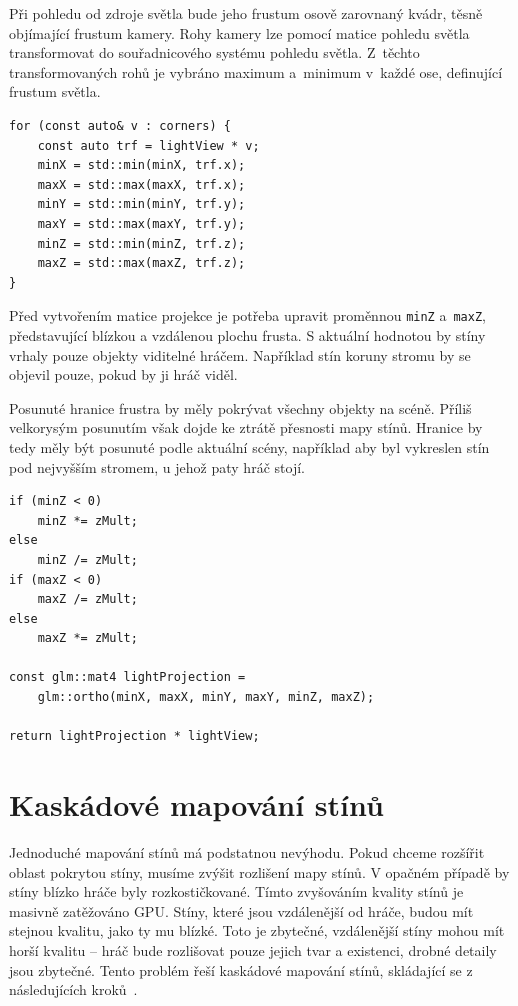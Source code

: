 \documentclass[thesis=M,czech]{FITthesis}[2019/12/23]
\begin{document}
Při pohledu od zdroje světla bude jeho frustum osově zarovnaný kvádr, těsně objímající frustum kamery. Rohy kamery lze pomocí matice pohledu světla transformovat do souřadnicového systému pohledu světla. Z~těchto transformovaných rohů je vybráno maximum a~minimum v~každé ose, definující frustum světla.

\begin{verbatim}
for (const auto& v : corners) {
    const auto trf = lightView * v;
    minX = std::min(minX, trf.x);
    maxX = std::max(maxX, trf.x);
    minY = std::min(minY, trf.y);
    maxY = std::max(maxY, trf.y);
    minZ = std::min(minZ, trf.z);
    maxZ = std::max(maxZ, trf.z);
}
\end{verbatim}

Před vytvořením matice projekce je potřeba upravit proměnnou \texttt{minZ} a~\texttt{maxZ}, představující blízkou a vzdálenou plochu frusta. S aktuální hodnotou by stíny vrhaly pouze objekty viditelné hráčem. Například stín koruny stromu by se objevil pouze, pokud by ji hráč viděl.

Posunuté hranice frustra by měly pokrývat všechny objekty na scéně. Příliš velkorysým posunutím však dojde ke ztrátě přesnosti mapy stínů. Hranice by tedy měly být posunuté podle aktuální scény, například aby byl vykreslen stín pod nejvyšším stromem, u jehož paty hráč stojí.


\begin{verbatim}
if (minZ < 0) 
    minZ *= zMult;
else 
    minZ /= zMult;
if (maxZ < 0) 
    maxZ /= zMult;
else 
    maxZ *= zMult;

const glm::mat4 lightProjection = 
    glm::ortho(minX, maxX, minY, maxY, minZ, maxZ);

return lightProjection * lightView;
\end{verbatim}

\section{Kaskádové mapování stínů}

Jednoduché mapování stínů má podstatnou nevýhodu. Pokud chceme rozšířit oblast pokrytou stíny, musíme zvýšit rozlišení mapy stínů. V opačném případě by stíny blízko hráče byly rozkostičkované. Tímto zvyšováním kvality stínů je masivně zatěžováno GPU. Stíny, které jsou vzdálenější od hráče, budou mít stejnou kvalitu, jako ty mu blízké. Toto je zbytečné, vzdálenější stíny mohou mít horší kvalitu -- hráč bude rozlišovat pouze jejich tvar a existenci, drobné detaily jsou zbytečné. Tento problém řeší kaskádové mapování stínů, skládající se z následujících kroků~\cite{lopgl_csm}.
\end{document}
